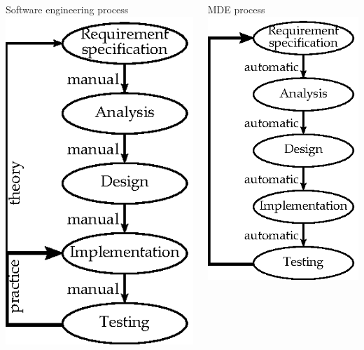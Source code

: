 \documentclass[dvips,slidetop,mathserif,brown]{beamer}
\begin{document}
\begin{frame}{}
  \begin{columns}[T]
    \begin{block}{Software engineering process}
      \includegraphics{process_se_3}
    \end{block}
    \begin{block}{MDE process}
      \includegraphics{process_mde}
    \end{block}
  \end{columns}
\end{frame}
\end{document}
